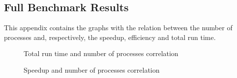 \subsection{Full Benchmark Results}

This appendix contains the graphs with the relation between the number of processes and, respectively, the speedup, efficiency and total run time.

\begin{figure}[!ht]
    \centering
    \begin{subfigure}{0.35\linewidth}
        
    \end{subfigure}
    \begin{subfigure}{0.35\linewidth}
        
    \end{subfigure}
    \begin{subfigure}{0.35\linewidth}
        
    \end{subfigure}
    \begin{subfigure}{0.35\linewidth}
        
    \end{subfigure}
    \caption{Total run time and number of processes correlation}
    \label{fig:exec_time}
\end{figure}

\begin{figure}[!ht]
    \centering
    \begin{subfigure}{0.35\linewidth}
        
    \end{subfigure}
    \begin{subfigure}{0.35\linewidth}
        
    \end{subfigure}
    \begin{subfigure}{0.35\linewidth}
        
    \end{subfigure}
    \begin{subfigure}{0.35\linewidth}
        
    \end{subfigure}
    \caption{Speedup and number of processes correlation}
    \label{fig:speedup}
\end{figure}

